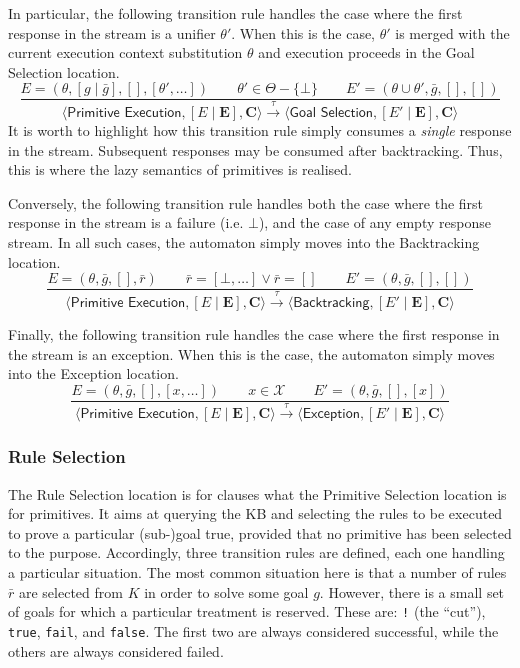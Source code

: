 \documentclass{article}
\newcommand{\stateStyle}[1]{\textsf{#1}}
\newcommand{\state}[1]{\stateStyle{#1}}
\newcommand{\stream}[1]{\bar{#1}}
\newcommand{\vect}[1]{\mathbf{#1}}
\newcommand{\notableset}[1]{\mathcal{#1}}
\newcommand{\transition}[1]{\xrightarrow{\ #1\ }}
\begin{document}
In particular, the following transition rule handles the case where the first response in the stream is a unifier $\theta'$.
%
When this is the case, $\theta'$ is merged with the current execution context substitution $\theta$ and execution proceeds in the \state{Goal Selection} location.
%
\[
    \frac{
        E = (\theta, [g \mid \stream{g}], [], [\theta', \ldots])
        \qquad
        \theta' \in \Theta - \{ \bot \}
        \qquad
        E' = (\theta \cup \theta', \stream{g}, [], [])
    }{
        \langle \state{Primitive Execution}, [E \mid \vect{E}], \vect{C} \rangle
        \transition{\tau}
        \langle \state{Goal Selection}, [E' \mid \vect{E}], \vect{C} \rangle
    }
\]
%
It is worth to highlight how this transition rule simply consumes a \emph{single} response in the stream.
%
Subsequent responses may be consumed after backtracking.
%
Thus, this is where the lazy semantics of primitives is realised. 

Conversely, the following transition rule handles both the case where the first response in the stream is a failure (i.e. $\bot$), and the case of any empty response stream.
%
In all such cases, the automaton simply moves into the \state{Backtracking} location.
\[
    \frac{
        E = (\theta, \stream{g}, [], \stream{r})
        \qquad
        \stream{r} = [\bot, \ldots] \lor \stream{r} = []
        \qquad
        E' = (\theta, \stream{g}, [], [])
    }{
        \langle \state{Primitive Execution}, [E \mid \vect{E}], \vect{C} \rangle
        \transition{\tau}
        \langle \state{Backtracking}, [E' \mid \vect{E}], \vect{C} \rangle
    }
\]

Finally, the following transition rule handles the case where the first response in the stream is an exception.
%
When this is the case, the automaton simply moves into the \state{Exception} location.
\[
    \frac{
        E = (\theta, \stream{g}, [], [x, \ldots])
        \qquad
        x \in \notableset{X}
        \qquad
        E' = (\theta, \stream{g}, [], [x])
    }{
        \langle \state{Primitive Execution}, [E \mid \vect{E}], \vect{C} \rangle
        \transition{\tau}
        \langle \state{Exception}, [E' \mid \vect{E}], \vect{C} \rangle
    }
\]

\subsubsection{Rule Selection}

The \state{Rule Selection} location is for clauses what the \state{Primitive Selection} location is for primitives.
%
It aims at querying the KB and selecting the rules to be executed to prove a particular (sub-)goal true, provided that no primitive has been selected to the purpose.
%
Accordingly, three transition rules are defined, each one handling a particular situation.
%
The most common situation here is that a number of rules $\stream{r}$ are selected from $K$ in order to solve some goal $g$.
%
However, there is a small set of goals for which a particular treatment is reserved.
%
These are: \texttt{!} (the ``cut''), \texttt{true}, \texttt{fail}, and \texttt{false}.
%
The first two are always considered successful, while the others are always considered failed.
\end{document}
